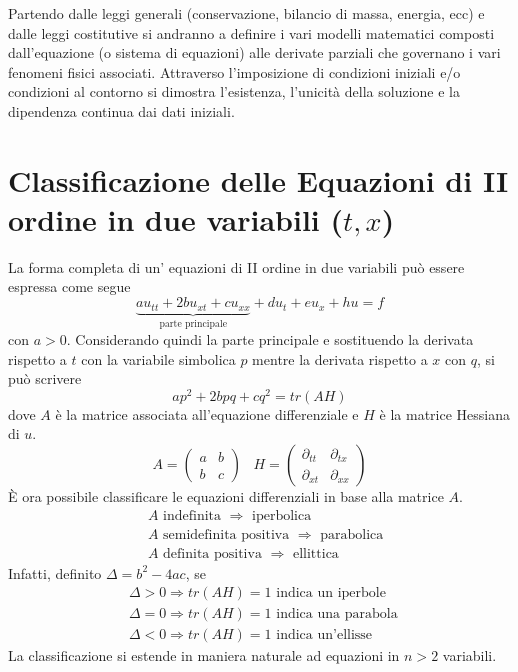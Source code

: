 Partendo dalle leggi generali (conservazione, bilancio di massa, energia, ecc) e dalle leggi costitutive si andranno a definire
i vari modelli matematici composti dall'equazione (o sistema di equazioni) alle derivate parziali che governano i vari fenomeni fisici associati.
Attraverso l'imposizione di condizioni iniziali e/o condizioni al contorno si dimostra l'esistenza, l'unicit\`a della soluzione e la dipendenza continua
dai dati iniziali.
\section{\texorpdfstring
{Classificazione delle Equazioni di II ordine in due variabili ($t,x$)}
{Classificazione delle Equazioni di II ordine in due variabili (t,x)}}
La forma completa di un' equazioni di II ordine in due variabili pu\`o essere espressa come segue
\[
	\underbrace{au_{tt}+2bu_{xt}+cu_{xx}}_\text{parte principale} + 
	du_t + eu_x + hu = f
\]
con $a>0$.
Considerando quindi la parte principale e sostituendo la derivata rispetto a $t$ con la variabile simbolica $p$ mentre la derivata 
rispetto a $x$ con $q$, si pu\`o scrivere
\[
	ap^2 + 2bpq + cq^2 = tr(AH)
\]
dove $A$ \`e la matrice associata all'equazione differenziale e $H$ \`e la matrice Hessiana di $u$.
\[
A=
 \begin{pmatrix}
  a & b \\
  b & c
 \end{pmatrix}
\;\;\;
H=
 \begin{pmatrix}
  \partial_{tt} & \partial_{tx} \\
  \partial_{xt} & \partial_{xx}
 \end{pmatrix}
\]
\`E ora possibile classificare le equazioni differenziali in base alla matrice $A$.
%
\begin{align*}
& A \mbox{ indefinita }  \Rightarrow  \mbox{ iperbolica}\\
& A \mbox{ semidefinita positiva }  \Rightarrow  \mbox{ parabolica}\\
& A \mbox{ definita positiva }  \Rightarrow  \mbox{ ellittica}
\end{align*}
%
Infatti, definito $\Delta=b^2-4ac$, se
%
\begin{align*}
& \Delta>0 \Rightarrow tr(AH)=1 \mbox{ indica un iperbole }\\
& \Delta=0 \Rightarrow tr(AH)=1 \mbox{ indica una parabola }\\
& \Delta<0 \Rightarrow tr(AH)=1 \mbox{ indica un'ellisse }
\end{align*}
%
La classificazione si estende in maniera naturale ad equazioni in $n>2$ variabili.

